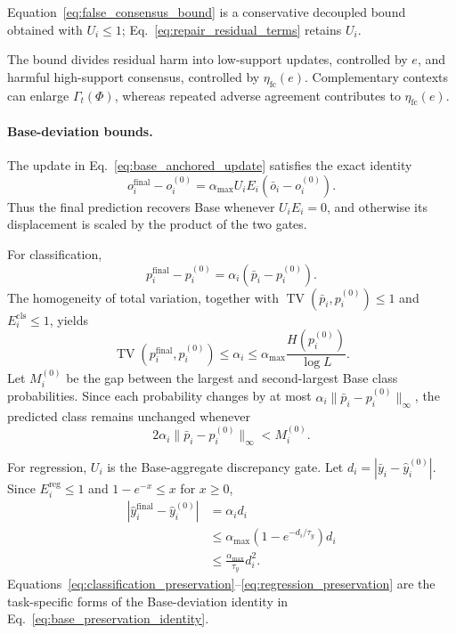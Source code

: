 Equation~\eqref{eq:false_consensus_bound} is a conservative decoupled bound
obtained with $U_i\leq1$; Eq.~\eqref{eq:repair_residual_terms} retains $U_i$.

The bound divides residual harm into low-support updates, controlled by
$e$, and harmful high-support consensus, controlled by
$\eta_{\mathrm{fc}}(e)$. Complementary contexts can enlarge
$\Gamma_t(\Phi)$, whereas repeated adverse agreement contributes to
$\eta_{\mathrm{fc}}(e)$.

\paragraph{Base-deviation bounds.}
\label{app:base-preservation}

The update in Eq.~\eqref{eq:base_anchored_update} satisfies the exact identity
\[
o_i^{\mathrm{final}}-o_i^{(0)}
=\alpha_{\max}U_iE_i(\bar o_i-o_i^{(0)}).
\]
Thus the final prediction recovers Base whenever $U_iE_i=0$, and otherwise
its displacement is scaled by the product of the two gates.

For classification,
\[
p_i^{\mathrm{final}}-p_i^{(0)}
=\alpha_i(\bar p_i-p_i^{(0)}).
\]
The homogeneity of total variation, together with
$\operatorname{TV}(\bar p_i,p_i^{(0)})\leq1$ and
$E_i^{\mathrm{cls}}\leq1$, yields
\begin{equation}
\operatorname{TV}(p_i^{\mathrm{final}},p_i^{(0)})
\leq\alpha_i
\leq\alpha_{\max}\frac{H(p_i^{(0)})}{\log L}.
\label{eq:classification_preservation}
\end{equation}
Let $M_i^{(0)}$ be the gap between the largest and second-largest Base class
probabilities.  Since each probability changes by at most
$\alpha_i\lVert\bar p_i-p_i^{(0)}\rVert_\infty$, the predicted class remains
unchanged whenever
\begin{equation}
2\alpha_i\lVert\bar p_i-p_i^{(0)}\rVert_\infty<M_i^{(0)}.
\label{eq:classification_margin_preservation}
\end{equation}

For regression, $U_i$ is the Base-aggregate discrepancy gate. Let
$d_i=|\bar y_i-\hat y_i^{(0)}|$. Since
$E_i^{\mathrm{reg}}\leq1$ and $1-e^{-x}\leq x$ for $x\geq0$,
\begin{equation}
\begin{aligned}
|\hat y_i^{\mathrm{final}}-\hat y_i^{(0)}|
&=\alpha_i d_i\\
&\leq\alpha_{\max}\left(1-e^{-d_i/\tau_y}\right)d_i\\
&\leq\frac{\alpha_{\max}}{\tau_y}d_i^2.
\end{aligned}
\label{eq:regression_preservation}
\end{equation}
Equations~\eqref{eq:classification_preservation}--\eqref{eq:regression_preservation}
are the task-specific forms of the Base-deviation identity in
Eq.~\eqref{eq:base_preservation_identity}.

